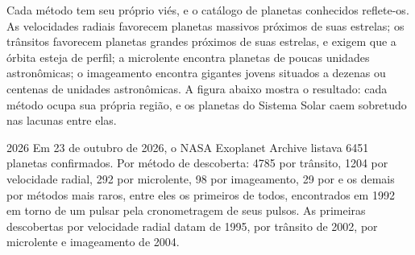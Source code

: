 Cada método tem seu próprio viés, e o catálogo de planetas conhecidos
reflete-os. As velocidades radiais favorecem planetas massivos próximos de suas
estrelas; os trânsitos favorecem planetas grandes próximos de suas estrelas, e exigem que a
órbita esteja de perfil; a microlente encontra planetas de poucas unidades astronômicas;
o imageamento encontra gigantes jovens situados a dezenas ou centenas de unidades astronômicas.
A figura abaixo mostra o resultado: cada método ocupa sua própria região, e
os planetas do Sistema Solar caem sobretudo nas lacunas entre elas.

\begin{dated}{2026}
Em 23 de outubro de 2026, o NASA Exoplanet Archive listava 6451 planetas
confirmados. Por método de descoberta: 4785 por trânsito, 1204 por
velocidade radial, 292 por microlente, 98 por imageamento, 29 por  e os demais por métodos mais raros, entre eles os primeiros de
todos, encontrados em 1992 em torno de um pulsar pela cronometragem de seus pulsos. As
primeiras descobertas por velocidade radial datam de 1995, por trânsito de 2002, por
microlente e imageamento de 2004.
\end{dated}

